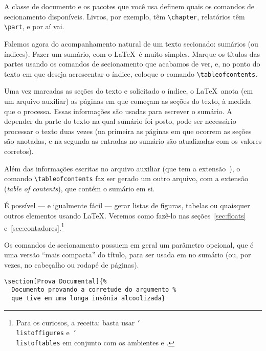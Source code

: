 A classe de documento e os pacotes que você usa definem quais os
comandos de secionamento disponíveis. Livros, por exemplo, têm
\verb'\chapter', relatórios têm \verb'\part', e por aí vai.

Falemos agora do acompanhamento natural de um texto secionado:
sumários (ou índices). Fazer um sumário, com o
\LaTeX\ é muito simples. Marque os títulos das partes usando os comandos de
secionamento que acabamos de ver, e, no ponto do texto em que deseja
acrescentar o índice, coloque o comando \verb'\tableofcontents'.

Uma vez marcadas as seções do texto e solicitado o índice, o
\LaTeX\ anota (em um arquivo auxiliar) as páginas em que começam as
seções do texto, à medida que o processa. Essas informações
são usadas para escrever o sumário. A depender da parte do
texto na qual sumário foi posto, pode ser necessário processar o texto duas
vezes (na primeira as páginas em que ocorrem as seções são anotadas, e
na segunda as entradas no sumário são atualizadas com os valores
corretos).

Além das informações escritas no arquivo auxiliar (que tem a
extensão~), o comando \verb'\tableofcontents' faz ser
gerado um outro arquivo, com a extensão  (\emph{table of
  contents}), que contém o sumário em si. 

É possível --- e igualmente fácil --- gerar listas de figuras, tabelas
ou quaisquer outros elementos usando \LaTeX. Veremos como fazê-lo nas
seções~\ref{sec:floats} e~\ref{sec:contadores}.\footnote{Para os
  curiosos, a receita: basta usar  \texttt{\char`\\{}listoffigures}
  e~\texttt{\char`\\{}listoftables} em conjunto com os ambientes
   e .}


Os comandos de secionamento possuem em geral um parâmetro opcional,
que é uma versão ``mais compacta'' do título, para ser usada em no
sumário (ou, por vezes, no cabeçalho ou rodapé de páginas).
\begin{footnotesize}
\begin{verbatim}
\section[Prova Documental]{%
  Documento provando a corretude do argumento %
  que tive em uma longa insônia alcoolizada}
\end{verbatim}
\end{footnotesize}


